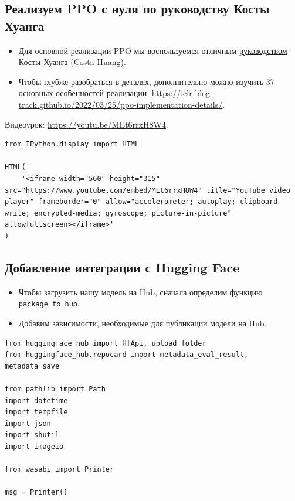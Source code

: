 \documentclass[11pt,a4paper]{article}
\begin{document}
\subsection{Реализуем PPO с нуля по руководству Косты Хуанга}\label{lets-code-ppo-from-scratch-with-costa-huangs-tutorial}

\begin{itemize}
\tightlist
\item
  Для основной реализации PPO мы воспользуемся отличным \href{https://costa.sh/}{руководством Косты Хуанга (Costa Huang)}.
\item
  Чтобы глубже разобраться в деталях, дополнительно можно изучить 37 основных особенностей реализации: \url{https://iclr-blog-track.github.io/2022/03/25/ppo-implementation-details/}.
\end{itemize}

Видеоурок: \url{https://youtu.be/MEt6rrxH8W4}.

\begin{lstlisting}
from IPython.display import HTML

HTML(
    '<iframe width="560" height="315" src="https://www.youtube.com/embed/MEt6rrxH8W4" title="YouTube video player" frameborder="0" allow="accelerometer; autoplay; clipboard-write; encrypted-media; gyroscope; picture-in-picture" allowfullscreen></iframe>'
)
\end{lstlisting}

\subsection{Добавление интеграции с Hugging Face}\label{add-the-hugging-face-integration}

\begin{itemize}
\item
  Чтобы загрузить нашу модель на Hub, сначала определим функцию \texttt{package\_to\_hub}.
\item
  Добавим зависимости, необходимые для публикации модели на Hub.
\end{itemize}

\begin{lstlisting}
from huggingface_hub import HfApi, upload_folder
from huggingface_hub.repocard import metadata_eval_result, metadata_save

from pathlib import Path
import datetime
import tempfile
import json
import shutil
import imageio

from wasabi import Printer

msg = Printer()
\end{lstlisting}
\end{document}
